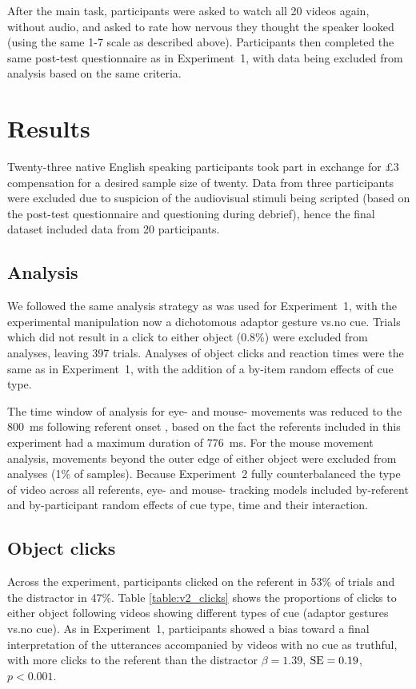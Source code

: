 \documentclass[a4paper,man,natbib]{apa6}
\newcommand{\resultsLog}[3]{$\beta = #1$, $\textnormal{SE} = #2$, $p #3$}
\begin{document}
After the main task, participants were asked to watch all 20 videos again, without audio, and asked to rate how nervous they thought the speaker looked (using the same 1-7 scale as described above).
Participants then completed the same post-test questionnaire as in Experiment~1, with data being excluded from analysis based on the same criteria.

\section{Results}
Twenty-three native English speaking participants took part in exchange for \pounds{}3 compensation for a desired sample size of twenty. 
Data from three participants were excluded due to suspicion of the audiovisual stimuli being scripted (based on the post-test questionnaire and questioning during debrief), hence the final dataset included data from 20 participants.

\subsection{Analysis}
We followed the same analysis strategy as was used for Experiment~1, with the experimental manipulation now a dichotomous adaptor gesture vs.\@ no cue.
Trials which did not result in a click to either object (0.8\%) were excluded from analyses, leaving 397 trials.
Analyses of object clicks and reaction times were the same as in Experiment~1, with the addition of a by-item random effects of cue type.

The time window of analysis for eye- and mouse- movements was reduced to the 800~ms following referent onset \citep[as in][]{Loy2017,King2018}, based on the fact the referents included in this experiment had a maximum duration of 776~ms. 
For the mouse movement analysis, movements beyond the outer edge of either object were excluded from analyses (1\% of samples).
Because Experiment~2 fully counterbalanced the type of video across all referents, eye- and mouse- tracking models included by-referent and by-participant random effects of cue type, time and their interaction.

\subsection{Object clicks}
Across the experiment, participants clicked on the referent in 53\% of trials and the distractor in 47\%.
Table \ref{table:v2_clicks} shows the proportions of clicks to either object following videos showing different types of cue (adaptor gestures vs.\@ no cue).
As in Experiment~1, participants showed a bias toward a final interpretation of the utterances accompanied by videos with no cue as truthful, with more clicks to the referent than the distractor \resultsLog{1.39}{0.19}{<0.001}.
\end{document}
